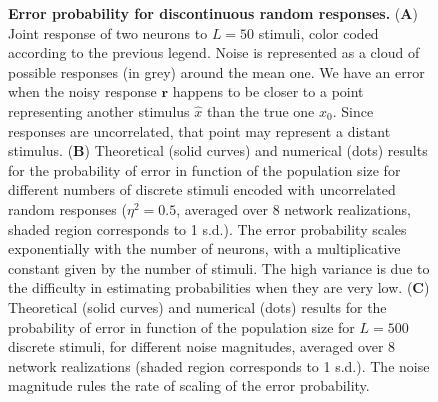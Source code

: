 \documentclass[a4paper]{article}%
\begin{document}
\begin{figure}[ptb]
\centering
{}\caption{\textbf{Error
probability for discontinuous random responses.} (\textbf{A}) Joint response
of two neurons to $L=50$ stimuli, color coded according to the previous
legend. Noise is represented as a cloud of possible responses (in grey) around
the mean one. We have an error when the noisy response $\mathbf{r}$ happens to
be closer to a point representing another stimulus $\hat{x}$ than the true one
$x_{0}$. Since responses are uncorrelated, that point may represent a distant
stimulus. (\textbf{B}) Theoretical (solid curves) and numerical (dots) results
for the probability of error in function of the population size for different
numbers of discrete stimuli encoded with uncorrelated random responses
($\eta^{2}=0.5$, averaged over 8 network realizations, shaded region
corresponds to 1 s.d.). The error probability scales exponentially with the
number of neurons, with a multiplicative constant given by the number of
stimuli. The high variance is due to the difficulty in estimating
probabilities when they are very low. (\textbf{C}) Theoretical (solid curves)
and numerical (dots) results for the probability of error in function of the
population size for $L=500$ discrete stimuli, for different noise magnitudes,
averaged over 8 network realizations (shaded region corresponds to 1 s.d.).
The noise magnitude rules the rate of scaling of the error probability.}%
\label{Fig:2}%
\end{figure}

\clearpage
\end{document}

